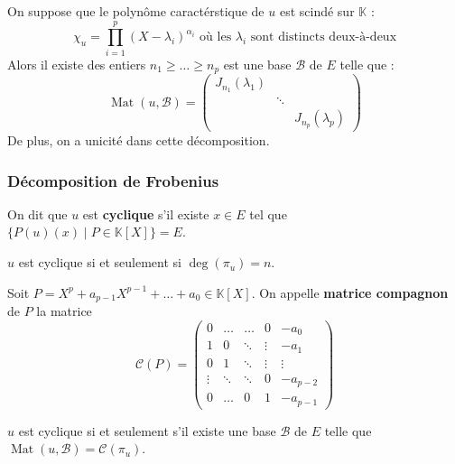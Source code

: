 
	\begin{theorem}
		On suppose que le polynôme caractérstique de $u$ est scindé sur $\mathbb{K}$ :
		\[ \chi_u = \prod_{i=1}^p (X - \lambda_i)^{\alpha_i} \text{ où les } \lambda_i \text{ sont distincts deux-à-deux} \]
		Alors il existe des entiers $n_1 \geq \dots \geq n_p$ est une base $\mathcal{B}$ de $E$ telle que :
		\[ \operatorname{Mat}(u, \mathcal{B}) = \begin{pmatrix} J_{n_1}(\lambda_1) & & \\ & \ddots & \\ & & J_{n_p}(\lambda_p) \end{pmatrix} \]
		De plus, on a unicité dans cette décomposition.
	\end{theorem}

	\subsubsection{Décomposition de Frobenius}


	\begin{definition}
		On dit que $u$ est \textbf{cyclique} s'il existe $x \in E$ tel que $\{ P(u)(x) \mid P \in \mathbb{K}[X] \} = E$.
	\end{definition}

	\begin{proposition}
		$u$ est cyclique si et seulement si $\deg(\pi_u) = n$.
	\end{proposition}

	\begin{definition}
		Soit $P = X^p + a_{p-1} X^{p-1} + \dots + a_0 \in \mathbb{K}[X]$. On appelle \textbf{matrice compagnon} de $P$ la matrice
		\[ \mathcal{C}(P) = \begin{pmatrix} 0 & \dots & \dots & 0 & -a_0 \\ 1 & 0 & \ddots & \vdots & -a_1 \\ 0 & 1 & \ddots & \vdots & \vdots \\ \vdots & \ddots & \ddots & 0 & -a_{p-2} \\ 0 & \dots & 0 & 1 & -a_{p-1} \end{pmatrix} \]
	\end{definition}

	\begin{proposition}
		$u$ est cyclique si et seulement s'il existe une base $\mathcal{B}$ de $E$ telle que $\operatorname{Mat}(u, \mathcal{B}) = \mathcal{C}(\pi_u)$.
	\end{proposition}

